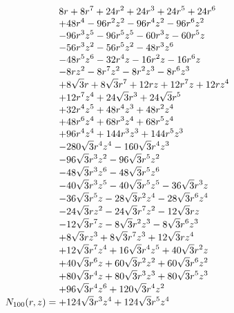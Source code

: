 \documentclass[11pt,a4paper]{article}
\begin{document}
\begin{equation}
N_{100}(r,z)=\shortstack[l]{$\displaystyle 8 r + 8 r^{7} + 24 r^{2} + 24 r^{3} + 24 r^{5} + 24 r^{6}$\\
$\displaystyle  + 48 r^{4} - 96 r^{2} z^{2} - 96 r^{4} z^{2} - 96 r^{6} z^{2}$\\
$\displaystyle  - 96 r^{3} z^{5} - 96 r^{5} z^{5} - 60 r^{3} z - 60 r^{5} z$\\
$\displaystyle  - 56 r^{3} z^{2} - 56 r^{5} z^{2} - 48 r^{3} z^{6}$\\
$\displaystyle  - 48 r^{5} z^{6} - 32 r^{4} z - 16 r^{2} z - 16 r^{6} z$\\
$\displaystyle  - 8 r z^{2} - 8 r^{7} z^{2} - 8 r^{2} z^{3} - 8 r^{6} z^{3}$\\
$\displaystyle  + 8 \sqrt{3} r + 8 \sqrt{3} r^{7} + 12 r z + 12 r^{7} z + 12 r z^{4}$\\
$\displaystyle  + 12 r^{7} z^{4} + 24 \sqrt{3} r^{3} + 24 \sqrt{3} r^{5}$\\
$\displaystyle  + 32 r^{4} z^{5} + 48 r^{4} z^{3} + 48 r^{2} z^{4}$\\
$\displaystyle  + 48 r^{6} z^{4} + 68 r^{3} z^{4} + 68 r^{5} z^{4}$\\
$\displaystyle  + 96 r^{4} z^{4} + 144 r^{3} z^{3} + 144 r^{5} z^{3}$\\
$\displaystyle  - 280 \sqrt{3} r^{4} z^{4} - 160 \sqrt{3} r^{4} z^{3}$\\
$\displaystyle  - 96 \sqrt{3} r^{3} z^{2} - 96 \sqrt{3} r^{5} z^{2}$\\
$\displaystyle  - 48 \sqrt{3} r^{3} z^{6} - 48 \sqrt{3} r^{5} z^{6}$\\
$\displaystyle  - 40 \sqrt{3} r^{3} z^{5} - 40 \sqrt{3} r^{5} z^{5} - 36 \sqrt{3} r^{3} z$\\
$\displaystyle  - 36 \sqrt{3} r^{5} z - 28 \sqrt{3} r^{2} z^{4} - 28 \sqrt{3} r^{6} z^{4}$\\
$\displaystyle  - 24 \sqrt{3} r z^{2} - 24 \sqrt{3} r^{7} z^{2} - 12 \sqrt{3} r z$\\
$\displaystyle  - 12 \sqrt{3} r^{7} z - 8 \sqrt{3} r^{2} z^{3} - 8 \sqrt{3} r^{6} z^{3}$\\
$\displaystyle  + 8 \sqrt{3} r z^{3} + 8 \sqrt{3} r^{7} z^{3} + 12 \sqrt{3} r z^{4}$\\
$\displaystyle  + 12 \sqrt{3} r^{7} z^{4} + 16 \sqrt{3} r^{4} z^{5} + 40 \sqrt{3} r^{2} z$\\
$\displaystyle  + 40 \sqrt{3} r^{6} z + 60 \sqrt{3} r^{2} z^{2} + 60 \sqrt{3} r^{6} z^{2}$\\
$\displaystyle  + 80 \sqrt{3} r^{4} z + 80 \sqrt{3} r^{3} z^{3} + 80 \sqrt{3} r^{5} z^{3}$\\
$\displaystyle  + 96 \sqrt{3} r^{4} z^{6} + 120 \sqrt{3} r^{4} z^{2}$\\
$\displaystyle  + 124 \sqrt{3} r^{3} z^{4} + 124 \sqrt{3} r^{5} z^{4}$}
\label{eq:cat-numerator-100}
\end{equation}
\end{document}
